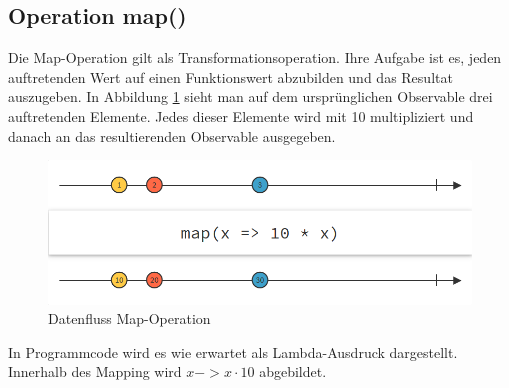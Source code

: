 \subsection{Operation map()}
Die Map-Operation gilt als Transformationsoperation. Ihre Aufgabe ist es, jeden auftretenden Wert auf einen Funktionswert abzubilden und das Resultat auszugeben. In Abbildung \ref{pic:map} sieht man auf dem ursprünglichen Observable drei auftretenden Elemente. Jedes dieser Elemente wird mit 10 multipliziert und danach an das resultierenden Observable ausgegeben. 
\begin{figure}
	\centering
	\includegraphics[width=1\textwidth]{Abb/map}
	\caption{Datenfluss Map-Operation}
	\label{pic:map}
\end{figure}
 
In Programmcode wird es wie erwartet als Lambda-Ausdruck dargestellt. Innerhalb des Mapping wird $x -> x \cdot 10$ abgebildet.
